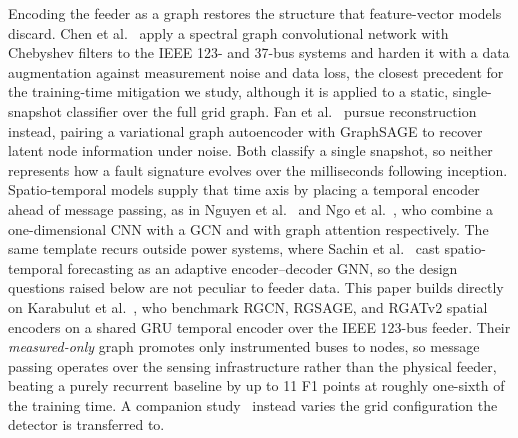 \documentclass[3p,times,procedia]{elsarticle}
\begin{document}
Encoding the feeder as a graph restores the structure that feature-vector models discard. Chen et al.~\cite{chen2020} apply a spectral graph convolutional network with Chebyshev filters to the IEEE 123- and 37-bus systems and harden it with a data augmentation against measurement noise and data loss, the closest precedent for the training-time mitigation we study, although it is applied to a static, single-snapshot classifier over the full grid graph. Fan et al.~\cite{fan2024} pursue reconstruction instead, pairing a variational graph autoencoder with GraphSAGE to recover latent node information under noise. Both classify a single snapshot, so neither represents how a fault signature evolves over the milliseconds following inception. Spatio-temporal models supply that time axis by placing a temporal encoder ahead of message passing, as in Nguyen et al.~\cite{nguyen2022} and Ngo et al.~\cite{ngo2025}, who combine a one-dimensional CNN with a GCN and with graph attention respectively. The same template recurs outside power systems, where Sachin et al.~\cite{sachin2025} cast spatio-temporal forecasting as an adaptive encoder--decoder GNN, so the design questions raised below are not peculiar to feeder data. This paper builds directly on Karabulut et al.~\cite{Karabulut2026}, who benchmark RGCN, RGSAGE, and RGATv2 spatial encoders on a shared GRU temporal encoder over the IEEE 123-bus feeder. Their \emph{measured-only} graph promotes only instrumented buses to nodes, so message passing operates over the sensing infrastructure rather than the physical feeder, beating a purely recurrent baseline by up to 11 F1 points at roughly one-sixth of the training time. A companion study~\cite{Karabulut2025} instead varies the grid configuration the detector is transferred to.
\end{document}
